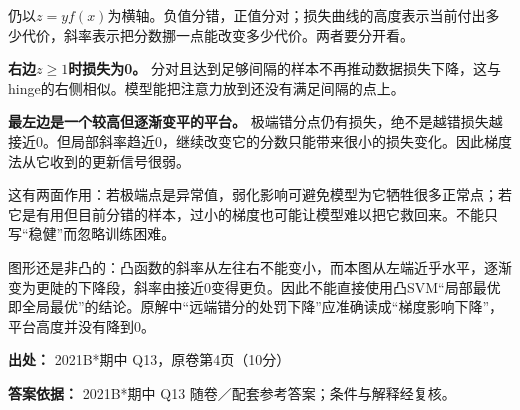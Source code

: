 仍以\(z=yf(x)\)为横轴。负值分错，正值分对；损失曲线的高度表示当前付出多少代价，斜率表示把分数挪一点能改变多少代价。两者要分开看。


\textbf{右边\(z\ge1\)时损失为0。} 分对且达到足够间隔的样本不再推动数据损失下降，这与hinge的右侧相似。模型能把注意力放到还没有满足间隔的点上。


\textbf{最左边是一个较高但逐渐变平的平台。} 极端错分点仍有损失，绝不是越错损失越接近0。但局部斜率趋近0，继续改变它的分数只能带来很小的损失变化。因此梯度法从它收到的更新信号很弱。


这有两面作用：若极端点是异常值，弱化影响可避免模型为它牺牲很多正常点；若它是有用但目前分错的样本，过小的梯度也可能让模型难以把它救回来。不能只写“稳健”而忽略训练困难。


图形还是非凸的：凸函数的斜率从左往右不能变小，而本图从左端近乎水平，逐渐变为更陡的下降段，斜率由接近0变得更负。因此不能直接使用凸SVM“局部最优即全局最优”的结论。原解中“远端错分的处罚下降”应准确读成“梯度影响下降”，平台高度并没有降到0。


\textbf{出处：} 2021B*期中 Q13，原卷第4页（10分）


\textbf{答案依据：} 2021B*期中 Q13 随卷／配套参考答案；条件与解释经复核。

